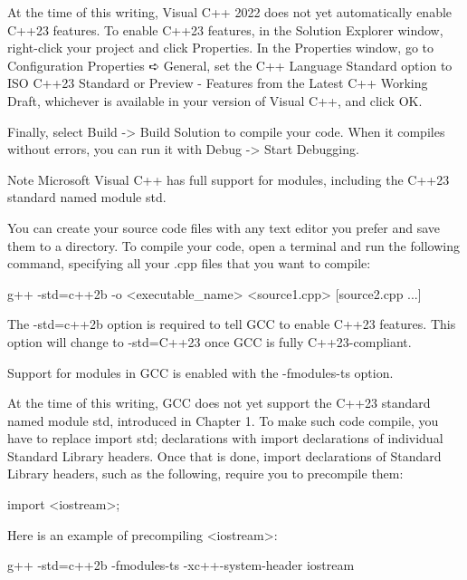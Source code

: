 At the time of this writing, Visual C++ 2022 does not yet automatically enable C++23 features. To enable C++23 features, in the Solution Explorer window, right-click your project and click Properties. In the Properties window, go to Configuration Properties ➪ General, set the C++ Language Standard option to ISO C++23 Standard or Preview - Features from the Latest C++ Working Draft, whichever is available in your version of Visual C++, and click OK.

Finally, select Build -> Build Solution to compile your code. When it compiles without errors, you can run it with Debug -> Start Debugging.

\begin{myNotic}{Note}
Microsoft Visual C++ has full support for modules, including the C++23 standard named module std.
\end{myNotic}


You can create your source code files with any text editor you prefer and save them to a directory. To compile your code, open a terminal and run the following command, specifying all your .cpp files that you want to compile:

\begin{shell}
g++ -std=c++2b -o <executable_name> <source1.cpp> [source2.cpp ...]
\end{shell}

The -std=c++2b option is required to tell GCC to enable C++23 features. This option will change to -std=C++23 once GCC is fully C++23-compliant.


Support for modules in GCC is enabled with the -fmodules-ts option.

At the time of this writing, GCC does not yet support the C++23 standard named module std, introduced in Chapter 1. To make such code compile, you have to replace import std; declarations with import declarations of individual Standard Library headers. Once that is done, import declarations of Standard Library headers, such as the following, require you to precompile them:

\begin{cpp}
import <iostream>;
\end{cpp}

Here is an example of precompiling <iostream>:

\begin{shell}
g++ -std=c++2b -fmodules-ts -xc++-system-header iostream
\end{shell}

